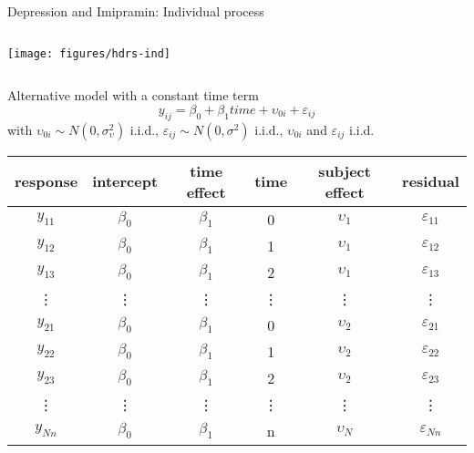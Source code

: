 \documentclass{beamer}
\begin{document}
\begin{frame}{Depression and Imipramin: Individual process}
  {\citep{ReisbyGram77}}
\begin{columns}
\begin{column}{12cm}
\vspace{-.45cm}
\texttt{[image: figures/hdrs-ind]}
\end{column}
\end{columns}
\end{frame}

\begin{frame}{Alternative model with a constant time term}
  \centering
  \vspace{-1cm}
  \[
    y_{ij} = \beta_0 + \beta_1 time + \upsilon_{0i} + \varepsilon_{ij}
  \]
with $\upsilon_{0i} \sim N(0, \sigma^2_{\upsilon})$ i.i.d.,
$\varepsilon_{ij} \sim N(0, \sigma^2)$ i.i.d., $\upsilon_{0i}$ and
$\varepsilon_{ij}$ i.i.d.\\[2ex]

  \begin{tabular}{cccccc}
    \hline
    response & intercept & time effect & time & subject effect  & residual \\
    \hline
    $y_{11}$ & $\beta_0$ & $\beta_1$   & 0    & $\upsilon_{1}$ & $\varepsilon_{11}$ \\
    $y_{12}$ & $\beta_0$ & $\beta_1$   & 1    & $\upsilon_{1}$ & $\varepsilon_{12}$ \\
    $y_{13}$ & $\beta_0$ & $\beta_1$   & 2    & $\upsilon_{1}$ & $\varepsilon_{13}$ \\
    \vdots & \vdots & \vdots   & \vdots & \vdots & \vdots \\
    $y_{21}$ & $\beta_0$ & $\beta_1$   & 0    & $\upsilon_{2}$ & $\varepsilon_{21}$ \\
    $y_{22}$ & $\beta_0$ & $\beta_1$   & 1    & $\upsilon_{2}$ & $\varepsilon_{22}$ \\
    $y_{23}$ & $\beta_0$ & $\beta_1$   & 2    & $\upsilon_{2}$ & $\varepsilon_{23}$ \\
    \vdots & \vdots & \vdots   & \vdots & \vdots & \vdots \\
    $y_{Nn}$ & $\beta_0$ & $\beta_1$   & n    & $\upsilon_{N}$ & $\varepsilon_{Nn}$ \\
    \hline
  \end{tabular}
\end{frame}
\end{document}
